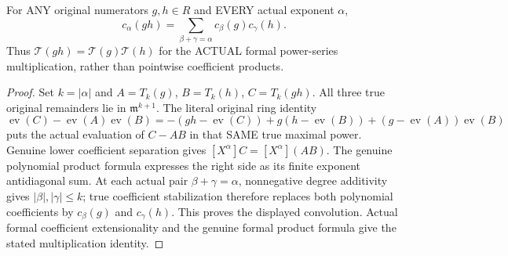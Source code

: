 \begin{theorem}
\label{hir:actual-original-formal-taylor-genuine-convolution}
\leanok
For ANY original numerators $g,h\in R$ and EVERY actual exponent $\alpha$,
\[
 c_\alpha(gh)=\sum_{\beta+\gamma=\alpha}c_\beta(g)c_\gamma(h).
\]
Thus $\mathcal T(gh)=\mathcal T(g)\mathcal T(h)$ for the ACTUAL formal
power-series multiplication, rather than pointwise coefficient products.
\end{theorem}
\begin{proof}
Set $k=|\alpha|$ and $A=T_k(g)$, $B=T_k(h)$, $C=T_k(gh)$.
All three true original remainders lie in $\mathfrak m^{k+1}$. The literal
original ring identity
\[
 \operatorname{ev}(C)-\operatorname{ev}(A)\operatorname{ev}(B)
 =-(gh-\operatorname{ev}(C))
   +g(h-\operatorname{ev}(B))
   +(g-\operatorname{ev}(A))\operatorname{ev}(B)
\]
puts the actual evaluation of $C-AB$ in that SAME true maximal power.
Genuine lower coefficient separation gives $[X^\alpha]C=[X^\alpha](AB)$.
The genuine polynomial product formula expresses the right side as its
finite exponent antidiagonal sum. At each actual pair $\beta+\gamma=\alpha$,
nonnegative degree additivity gives $|\beta|,|\gamma|\le k$; true
coefficient stabilization therefore replaces both polynomial coefficients
by $c_\beta(g)$ and $c_\gamma(h)$. This proves the displayed convolution.
Actual formal coefficient extensionality and the genuine formal product
formula give the stated multiplication identity.
\end{proof}

